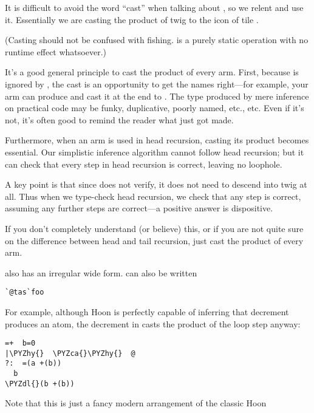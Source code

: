 It is difficult to avoid the word ``cast'' when talking about
, so we relent and use it.  Essentially we are casting the
product of twig  to the icon of tile .

(Casting should not be confused with fishing.   is a purely
static operation with no runtime effect whatsoever.)

It's a good general principle to cast the product of every arm.
First, because  is ignored by , the cast is an
opportunity to get the names right---for example, your arm can
produce  and cast it at the end to \kode{[p=foo q=bar]}.
The type produced by mere inference on practical code may be
funky, duplicative, poorly named, etc., etc.  Even if it's not,
it's often good to remind the reader what just got made.

Furthermore, when an arm is used in head recursion, casting its
product becomes essential.  Our simplistic inference algorithm
cannot follow head recursion; but it can check that every step in
head recursion is correct, leaving no loophole.  

A key point is that since  does not verify, it does not
need to descend into twig  at all.  Thus when we type-check
head recursion, we check that any step is correct, assuming any
further steps are correct---a positive answer is dispositive.

If you don't completely understand (or believe) this, or if you are
not quite sure on the difference between head and tail recursion,
just cast the product of every arm.

 also has an irregular wide form.   can also
be written

\begin{framed_shaded}
\begin{Verbatim}[fontsize=\relsize{-2.5},fontseries=b,commandchars=\\\{\}]
`@tas`foo
\end{Verbatim}
\end{framed_shaded}
For example, although Hoon is perfectly capable of inferring that
decrement produces an atom, the decrement in  casts
the product of the loop step anyway:

\begin{framed_shaded}
\begin{Verbatim}[fontsize=\relsize{-2.5},fontseries=b,commandchars=\\\{\}]
=+  b=0
|\PYZhy{}  \PYZca{}\PYZhy{}  @
?:  =(a +(b))
  b
\PYZdl{}(b +(b))
\end{Verbatim}
\end{framed_shaded}
Note that this is just a fancy modern arrangement of the classic Hoon 

